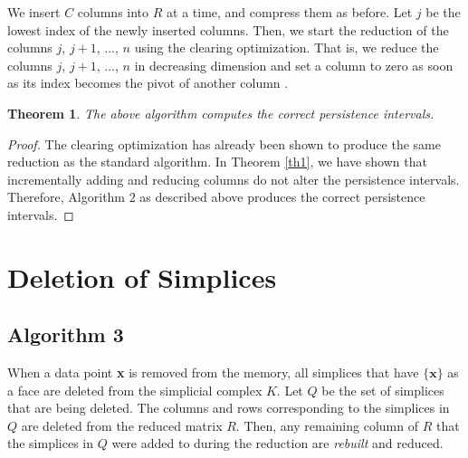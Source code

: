 \documentclass[11pt]{article}
\newtheorem{theorem}{Theorem}[section]
\begin{document}
We insert $C$ columns into $R$ at a time, and compress them as before.  Let $j$ be the lowest index 
of the newly inserted columns.  Then, we start the reduction of the columns $j$, $j + 1$, ..., $n$ 
using the clearing optimization.  That is, we reduce the columns $j$, $j + 1$, ..., $n$ in 
decreasing dimension and set a column to zero as soon as its index becomes the pivot of another 
column \cite{chen-11}.


\begin{theorem}
	The above algorithm computes the correct persistence intervals.
\end{theorem}


\begin{proof}
	
	The clearing optimization has already been shown to produce the same reduction as the standard
	algorithm.  In Theorem \ref{th1}, we have shown that incrementally adding and reducing columns  
	do not alter the persistence intervals.  Therefore, Algorithm $2$ as described above produces 
	the correct persistence intervals.
	
\end{proof}




\section{Deletion of Simplices}

\subsection{Algorithm 3}

When a data point \textbf{x} is removed from the memory, all simplices that have $\{\textbf{x}\}$ 
as a face are deleted from the simplicial complex $K$. Let $Q$ be the set of simplices that are 
being deleted.  The columns and rows corresponding to the simplices in $Q$ are deleted from the 
reduced matrix $R$.  Then, any remaining column of $R$ that the simplices in $Q$ were added to 
during the reduction are \emph{rebuilt} and reduced.








\end{document}
